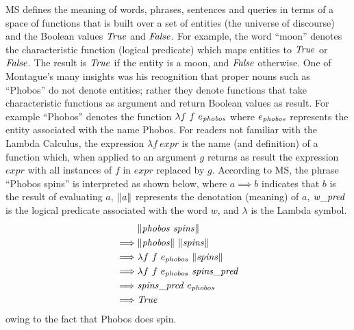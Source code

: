 \documentclass[../main.tex]{subfiles}
\begin{document}
\begin{refsection}
MS \cite{Dowty:wall} defines the meaning of words, phrases, sentences and queries in terms of a space of functions that is
built over a set of entities (the universe of discourse) and the Boolean values $\mathit{True}$ and $\mathit{False}$. For
example, the word ``moon'' denotes the characteristic function (logical predicate) which maps entities to
$\mathit{True}$ or $\mathit{False}$. The result is $\mathit{True}$ if the entity is a moon, and $\mathit{False}$ otherwise. One of Montague's many insights was his recognition that proper nouns such as ``Phobos'' do not denote entities; rather they
denote functions that take characteristic functions as argument and return Boolean values as result. For
example ``Phobos'' denotes the function $\lambda f \  f \  e_{\mathit{phobos}}$ where $e_{\mathit{phobos}}$ represents the entity associated with
the name Phobos. For readers not familiar with the Lambda Calculus, the expression $\lambda f \ \mathit{expr}$ is the
name (and definition) of a function which, when applied to an argument $g$ returns as result the
expression $\mathit{expr}$ with all instances of $f$ in $expr$ replaced by $g$. According to MS, the phrase ``Phobos
spins'' is interpreted as shown below, where $a \implies b$ indicates that $b$ is the result of evaluating $a$, $\lVert \mathit{a} \rVert$
represents the denotation (meaning) of $a$, $\mathit{w\_pred}$ is the logical predicate associated with the word $\mathit{w}$,
and $\lambda$ is the Lambda symbol.
\begin{equation*}
	\begin{split}
		& \meaningof{\phobos \ \spins} \\
		\implies&  \meaningof{\phobos}\ \meaningof{\spins} \\
		\implies&  \lambda f\ f \ \entityassoc{phobos} \ \meaningof{\spins} \\
		\implies&  \lambda f \ f \ \entityassoc{phobos} \ \wordpred{\spins} \\
		\implies&  \wordpred{\spins} \ \entityassoc{phobos} \\
		\implies&  \True
	\end{split}
\end{equation*}
owing to the fact that Phobos does spin.


\end{refsection}
\end{document}
